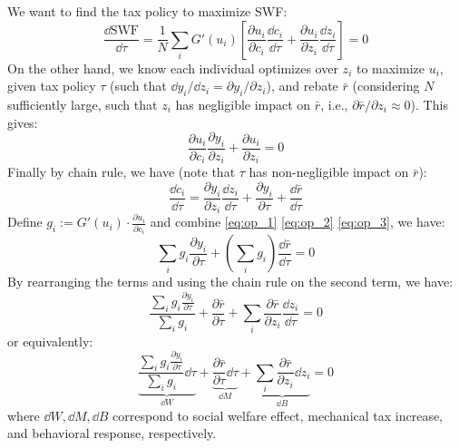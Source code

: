We want to find the tax policy to maximize SWF:
\begin{equation} \label{eq:op_1}
\frac{\dd \text{SWF}}{\dd \tau} = \frac{1}{N} \sum_i G'(u_i) \left[
\frac{\partial u_i}{\partial c_i} \frac{\dd c_i}{\dd \tau} + \frac{\partial u_i}{\partial z_i} \frac{\dd z_i}{\dd \tau}\right] =0
\end{equation}
On the other hand, we know each individual optimizes over $z_i$ to maximize $u_i$, given tax policy $\tau$ (such that ${\dd y_i}/{\dd z_i} = {\partial y_i}/{\partial z_i}$), and rebate $\bar{r}$ (considering $N$ sufficiently large, such that $z_i$ has negligible impact on $\bar{r}$, i.e., $\partial\bar{r}/\partial z_i \approx 0$). This gives:
\begin{equation} \label{eq:op_2}
\frac{\partial u_i}{\partial c_i} \frac{\partial y_i}{\partial z_i} + \frac{\partial u_i}{\partial z_i} = 0
\end{equation}
Finally by chain rule, we have (note that $\tau$ has non-negligible impact on $\bar{r}$):
\begin{equation} \label{eq:op_3}
\frac{\dd c_i}{\dd \tau} = \frac{\partial y_i}{\partial z_i}\frac{\dd z_i}{\dd \tau} +  \frac{\partial y_i}{\partial \tau} + \frac{\dd \bar{r}}{\dd \tau} 
\end{equation}
Define $g_i:= G'(u_i)\cdot\frac{\partial u_i}{\partial c_i} $ and combine \eqref{eq:op_1} \eqref{eq:op_2} \eqref{eq:op_3}, we have: 
\begin{equation*}
    \sum_i g_i \frac{\partial y_i}{\partial \tau} + (\sum_i g_i) \frac{\dd \bar{r}}{\dd \tau}  = 0
\end{equation*}
By rearranging the terms and using the chain rule on the second term, we have:
\begin{equation} \label{eq:general_form}
    \frac{\sum_i g_i \frac{\partial y_i}{\partial \tau}}{\sum_i g_i}  +  \frac{\partial \bar{r}}{\partial \tau}  + \sum_i \frac{\partial \bar{r}}{\partial z_i} \frac{\dd z_i}{\dd \tau} = 0
\end{equation}
or equivalently:
\begin{equation} \label{eq:general_form_difference}
    \underbrace{\frac{\sum_i g_i \frac{\partial y_i}{\partial \tau}}{\sum_i g_i} \dd \tau}_{\dd W} +  \underbrace{\frac{\partial \bar{r}}{\partial \tau} \dd \tau}_{\dd M} + \underbrace{\sum_i \frac{\partial \bar{r}}{\partial z_i} \dd z_i}_{\dd B} = 0
\end{equation}
where $\dd W, \dd M, \dd B$ correspond to social welfare effect, mechanical tax increase, and behavioral response, respectively.

